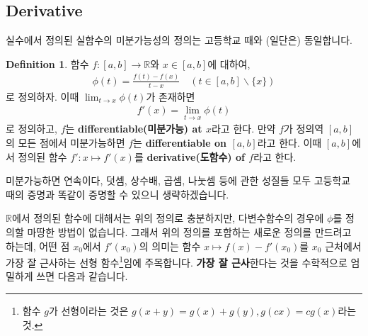 \documentclass[12pt]{article}
\theoremstyle{definition}
\newtheorem{defn}[thm]{Definition}
\def\RR{\mathbb{R}}
\begin{document}
\subsection{Derivative}

실수에서 정의된 실함수의 미분가능성의 정의는 고등학교 때와 (일단은) 동일합니다.

\begin{defn}
	함수 \(f: [a, b] \rightarrow \RR\)와 \(x \in [a, b]\)에 대하여, 
	\begin{gather*}
		\phi(t) = \frac{f(t) - f(x)}{t - x} \quad (t \in [a, b] \backslash \{x\})
	\end{gather*}
	로 정의하자. 이때 \(\lim_{t \rightarrow x} \phi(t)\)가 존재하면
	\begin{gather*}
		f'(x) = \lim_{t \rightarrow x} \phi(t)
	\end{gather*}
	로 정의하고, \(f\)는 \textbf{differentiable(미분가능) at \(x\)}라고 한다. 만약 \(f\)가 정의역 \([a, b]\)의 모든 점에서 미분가능하면 \(f\)는 \textbf{differentiable on \([a, b]\)}라고 한다. 이때 \([a, b]\)에서 정의된 함수 \(f': x \mapsto f'(x)\)를 \textbf{derivative(도함수) of \(f\)}라고 한다.
\end{defn}

미분가능하면 연속이다, 덧셈, 상수배, 곱셈, 나눗셈 등에 관한 성질들 모두 고등학교 때의 증명과 똑같이 증명할 수 있으니 생략하겠습니다.

\(\RR\)에서 정의된 함수에 대해서는 위의 정의로 충분하지만, 다변수함수의 경우에 \(\phi\)를 정의할 마땅한 방법이 없습니다. 그래서 위의 정의를 포함하는 새로운 정의를 만드려고 하는데, 어떤 점 \(x_0\)에서 \(f'(x_0)\)의 의미는 함수 \(x \mapsto f(x) - f'(x_0)\)를 \(x_0\) 근처에서 가장 잘 근사하는 선형 함수\footnote{함수 \(g\)가 선형이라는 것은 \(g(x+y) = g(x) + g(y), g(cx) = cg(x)\)라는 것.}임에 주목합니다. \textbf{가장 잘 근사}한다는 것을 수학적으로 엄밀하게 쓰면 다음과 같습니다.
\end{document}

